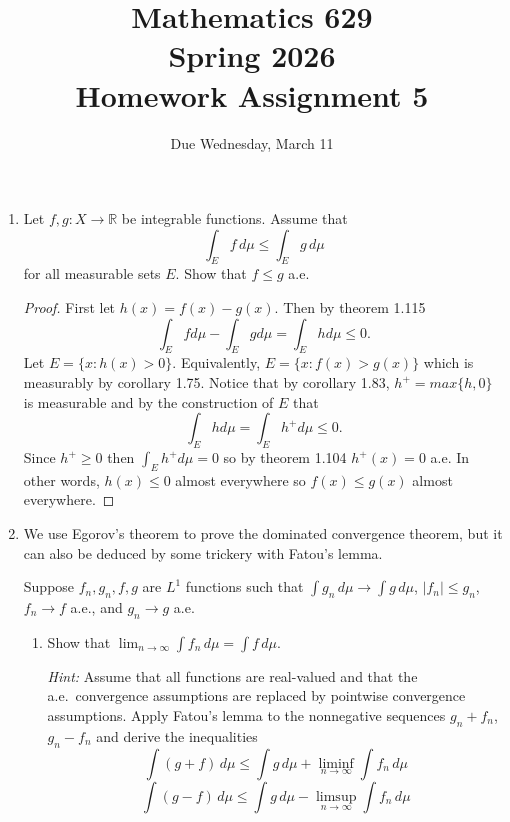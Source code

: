 \documentclass[11pt]{article}
\title{Mathematics 629 \\ Spring 2026 \\ Homework Assignment 5}
\date{Due Wednesday, March 11}
\author{}
\begin{document}
\maketitle
\thispagestyle{empty}

\begin{enumerate}[leftmargin=*, label=\textbf{\arabic*.}]

	\item Let $f, g : X \to \mathbb{R}$ be integrable functions. Assume that
	      \[
		      \int_E f\, d\mu \leq \int_E g\, d\mu
	      \]
	      for all measurable sets $E$. Show that $f \leq g$ a.e.

	      \begin{proof}
		      First let $h(x) = f(x) - g(x)$. Then by theorem 1.115
		      $$\int_E f d\mu - \int_E g d\mu = \int_E h d\mu \leq 0.$$
		      Let $E = \{x: h(x) > 0\}$. Equivalently, $E = \{x: f(x) > g(x) \}$ which is measurably by corollary 1.75.
		      Notice that by corollary 1.83, $h^+ = max\{h,0\}$ is measurable and by the construction of $E$ that
		      $$\int_E h d\mu = \int_E h^+ d\mu \leq 0.$$
		      Since $h^+ \geq 0$ then $\int_E h^+ d\mu = 0$ so by theorem 1.104 $h^+(x) = 0$ a.e. In other words, $h(x) \leq 0$ almost everywhere so $f(x) \leq g(x)$ almost everywhere.

	      \end{proof}

	\item We use Egorov's theorem to prove the dominated convergence theorem, but it can also be deduced by some trickery with Fatou's lemma.

	      Suppose $f_n, g_n, f, g$ are $L^1$ functions such that $\int g_n\, d\mu \to \int g\, d\mu$, $|f_n| \leq g_n$, $f_n \to f$ a.e., and $g_n \to g$ a.e.

	      \begin{enumerate}[label=(\roman*)]
		      \item Show that $\displaystyle\lim_{n\to\infty} \int f_n\, d\mu = \int f\, d\mu$.

		            \textit{Hint:} Assume that all functions are real-valued and that the a.e.\ convergence assumptions are replaced by pointwise convergence assumptions. Apply Fatou's lemma to the nonnegative sequences $g_n + f_n$, $g_n - f_n$ and derive the inequalities
		            \[
			            \int (g + f)\, d\mu \leq \int g\, d\mu + \liminf_{n\to\infty} \int f_n\, d\mu
		            \]
		            \[
			            \int (g - f)\, d\mu \leq \int g\, d\mu - \limsup_{n\to\infty} \int f_n\, d\mu
		            \]


\end{enumerate}
\end{enumerate}
\end{document}
